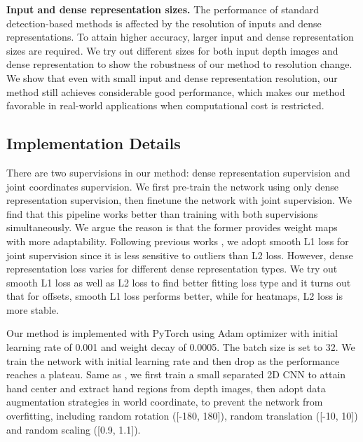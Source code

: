 \documentclass[letterpaper]{article} \usepackage{aaai20}  \usepackage{times}  \usepackage{helvet} \usepackage{courier}  \usepackage[hyphens]{url}  \usepackage{graphicx} \usepackage{amsmath}
\begin{document}
\parskip=0pt

\textbf{Input and dense representation sizes.} The performance of standard detection-based methods is affected by the resolution of inputs and dense representations. To attain higher accuracy, larger input and dense representation sizes are required. We try out different sizes for both input depth images and dense representation to show the robustness of our method to resolution change. We show that even with small input and dense representation resolution, our method still achieves considerable good performance, which makes our method favorable in real-world applications when computational cost is restricted. 

\parskip=0pt

\subsection{Implementation Details}

There are two supervisions in our method: dense representation supervision and joint coordinates supervision. We first pre-train the network using only dense representation supervision, then finetune the network with joint supervision. We find that this pipeline works better than training with both supervisions simultaneously. We argue the reason is that the former provides weight maps with more adaptability. Following previous works \cite{srn}, we adopt smooth L1 loss for joint supervision since it is less sensitive to outliers than L2 loss. However, dense representation loss varies for different dense representation types. We try out smooth L1 loss as well as L2 loss to find better fitting loss type and it turns out that for offsets, smooth L1 loss performs better, while for heatmaps, L2 loss is more stable. 

\parskip=0pt

Our method is implemented with PyTorch using Adam \cite{adam} optimizer with initial learning rate of 0.001 and weight decay of 0.0005. The batch size is set to 32. We train the network with initial learning rate and then drop as the performance reaches a plateau. Same as \cite{srn}, we first train a small separated 2D CNN to attain hand center and extract hand regions from depth images, then adopt data augmentation strategies in world coordinate, to prevent the network from overfitting, including random rotation ([-180, 180]), random translation ([-10, 10]) and random scaling ([0.9, 1.1]).

\parskip=0pt
\end{document}
